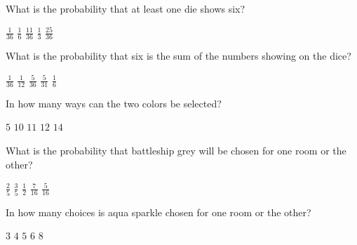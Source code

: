 \documentclass[answers,12pt]{exam}
\begin{document}
\begin{questions}
\question
What is the probability that at least one die shows six?\\
\begin{oneparchoices}
\choice $\frac{1}{36}$
\choice $\frac{1}{6}$
\correctchoice $\frac{11}{36}$
\choice $\frac{1}{3}$ %
\choice $\frac{25}{36}$ %
\end{oneparchoices}

\question\label{LastDice}
What is the probability that six is the sum of the numbers
showing on the dice?\\
\begin{oneparchoices}
\choice $\frac{1}{36}$
\choice $\frac{1}{12}$ %
\correctchoice $\frac{5}{36}$
\choice $\frac{5}{31}$ %
\choice $\frac{1}{6}$ %
\end{oneparchoices}


\question\label{FirstColor}
In how many ways can the two colors be selected?\\
\begin{oneparchoices}
\choice $5$ %
\correctchoice $10$
\choice $11$ %
\choice $12$ %
\choice $14$ %
\end{oneparchoices}

\question
What is the probability that battleship grey will be chosen
for one room or the other?\\
\begin{oneparchoices}
\choice $\frac{2}{5}$ %
\correctchoice $\frac{3}{5}$
\choice $\frac{1}{2}$ %
\choice $\frac{7}{16}$ %
\choice $\frac{5}{16}$ %
\end{oneparchoices}

\question
In how many choices is aqua sparkle chosen for
one room or the other?\\
\begin{oneparchoices}
\choice $3$
\correctchoice $4$
\choice $5$ %
\choice $6$ %
\choice $8$
\end{oneparchoices}


\end{questions}
\end{document}
